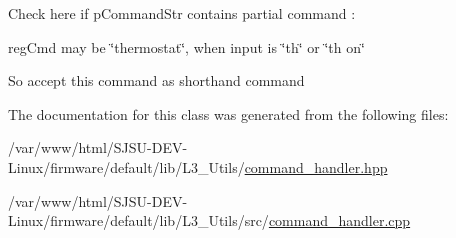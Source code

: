 Check here if p\+Command\+Str contains partial command \+:
\begin{DoxyItemize}
\item reg\+Cmd may be \char`\"{}thermostat\char`\"{}, when input is \char`\"{}th\char`\"{} or \char`\"{}th on\char`\"{}
\item So accept this command as shorthand command
\end{DoxyItemize}

The documentation for this class was generated from the following files\+:\begin{DoxyCompactItemize}
\item 
/var/www/html/\+S\+J\+S\+U-\/\+D\+E\+V-\/\+Linux/firmware/default/lib/\+L3\+\_\+\+Utils/\hyperlink{command__handler_8hpp}{command\+\_\+handler.\+hpp}\item 
/var/www/html/\+S\+J\+S\+U-\/\+D\+E\+V-\/\+Linux/firmware/default/lib/\+L3\+\_\+\+Utils/src/\hyperlink{command__handler_8cpp}{command\+\_\+handler.\+cpp}\end{DoxyCompactItemize}

